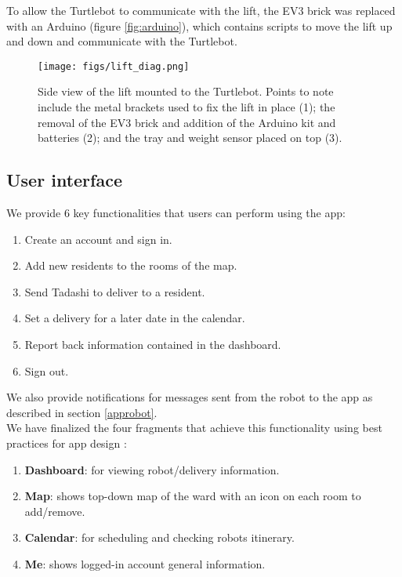 \documentclass{article}
\begin{document}
To allow the Turtlebot to communicate with the lift, the EV3 brick was replaced with an Arduino (figure \ref{fig:arduino}), which contains scripts to move the lift up and down and communicate with the Turtlebot. 


\begin{figure}
  \begin{center}
    \texttt{[image: figs/lift\_diag.png]}
    \caption{Side view of the lift mounted to the Turtlebot. Points to note include the metal brackets used to fix the lift in place (1); the removal of the EV3 brick and addition of the Arduino kit and batteries (2); and the tray and weight sensor placed on top (3).}
  \label{fig:lift}
  \end{center}
\end{figure}

\subsection{User interface}
\label{ui}
We provide 6 key functionalities that users can perform using the app:
\begin{enumerate}
\item Create an account and sign in. 
\item Add new residents to the rooms of the map.
\item Send Tadashi to deliver to a resident. 
\item Set a delivery for a later date in the calendar. 
\item Report back information contained in the dashboard.
\item Sign out.
\end{enumerate}
We also provide notifications for messages sent from the robot to the app as described in section \ref{approbot}.
\\
We have finalized the four fragments that achieve this functionality using best practices for app design \cite{design, ux}:
\begin{enumerate}
  \item {\bf Dashboard}: for viewing robot/delivery information.
  \item {\bf Map}: shows top-down map of the ward with an icon on each room to add/remove. 
  \item {\bf Calendar}: for scheduling and checking robots itinerary.
  \item {\bf Me}: shows logged-in account general information.
\end{enumerate}
\end{document}
